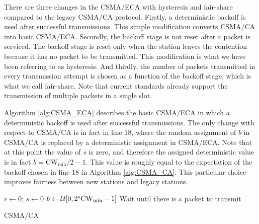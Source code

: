 \documentclass[conference]{IEEEtran}
\newcommand{\AzCom}[1]{}
\begin{document}
There are three changes in the CSMA/ECA with hysteresis and fair-share compared to the legacy CSMA/CA protocol. Firstly, a deterministic backoff is used after successful transmissions. This simple modification converts CSMA/CA into basic CSMA/ECA.
Secondly, the backoff stage is not reset after a packet is serviced.
The backoff stage is reset only when the station leaves the contention because it has no packet to be transmitted. This modification is what we have been referring to as hysteresis.
And thirdly, the number of packets transmitted in every transmission attempt is chosen as a function of the backoff stage, which is what we call fair-share.
Note that current standards already support the transmission of multiple packets in a single slot.

Algorithm \ref{alg:CSMA_ECA} describes the basic CSMA/ECA in which a deterministic backoff is used after successful transmissions. The only change with respect to CSMA/CA is in fact in line $18$, where the random assignment of $b$ in CSMA/CA is replaced by a deterministic assignment in CSMA/ECA. Note that at this point the value of $s$ is zero, and therefore the assigned deterministic value is in fact $b = \text{CW}_{\min}/2-1$. This value is roughly equal to the expectation of the backoff chosen in line $18$ in Algorithm \ref{alg:CSMA_CA}. This particular choice improves fairness between new stations and legacy stations. \AzCom{Does it? Even if they are not using aggregation?}

\begin{algorithm}[ht!!!]
{
  $r \leftarrow 0$; $s \leftarrow 0$\;
  $b \leftarrow \mathcal{U}[0,2^s{\rm{CW}_{min}}-1]$\;
  Wait until there is a packet to transmit\;
}
\caption{CSMA/CA}
\label{alg:CSMA_CA}
\end{algorithm}
\end{document}

